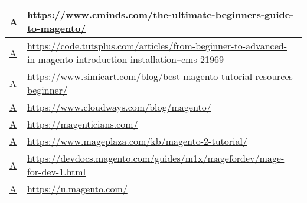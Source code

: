 \begin{table}[]
{\begin{tabular}{|l|p{20cm}|}
  \href{https://web.archive.org/web/20181114201450/https://www.cminds.com/the-ultimate-beginners-guide-to-magento/}{A}                                              & \href{https://www.cminds.com/the-ultimate-beginners-guide-to-magento/}{https://www.cminds.com/the-ultimate-beginners-guide-to-magento/} \\ \hline
  \href{https://web.archive.org/web/20181113030038/https://code.tutsplus.com/articles/from-beginner-to-advanced-in-magento-introduction-installation--cms-21969}{A} & \href{https://code.tutsplus.com/articles/from-beginner-to-advanced-in-magento-introduction-installation--cms-21969}{https://code.tutsplus.com/articles/from-beginner-to-advanced-in-magento-introduction-installation--cms-21969} \\ \hline
  \href{https://web.archive.org/web/20181113030108/https://www.simicart.com/blog/best-magento-tutorial-resources-beginner/}{A}                                      & \href{https://www.simicart.com/blog/best-magento-tutorial-resources-beginner/}{https://www.simicart.com/blog/best-magento-tutorial-resources-beginner/} \\ \hline
  \href{https://web.archive.org/web/20181113030148/https://www.cloudways.com/blog/magento/}{A}                                                                      & \href{https://www.cloudways.com/blog/magento/}{https://www.cloudways.com/blog/magento/} \\ \hline
  \href{https://web.archive.org/web/20181113030232/https://magenticians.com/}{A}                                                                                    & \href{https://magenticians.com/}{https://magenticians.com/} \\ \hline
  \href{https://web.archive.org/web/20181113030303/https://www.mageplaza.com/kb/magento-2-tutorial/}{A}                                                             & \href{https://www.mageplaza.com/kb/magento-2-tutorial/}{https://www.mageplaza.com/kb/magento-2-tutorial/} \\ \hline
  \href{https://web.archive.org/web/20181113030342/https://devdocs.magento.com/guides/m1x/magefordev/mage-for-dev-1.html}{A}                                        & \href{https://devdocs.magento.com/guides/m1x/magefordev/mage-for-dev-1.html}{https://devdocs.magento.com/guides/m1x/magefordev/mage-for-dev-1.html} \\ \hline
  \href{https://web.archive.org/web/20181113030401/https://u.magento.com/}{A}                                                                                       & \href{https://u.magento.com/}{https://u.magento.com/} \\ \hline

\end{tabular}}
\end{table}
